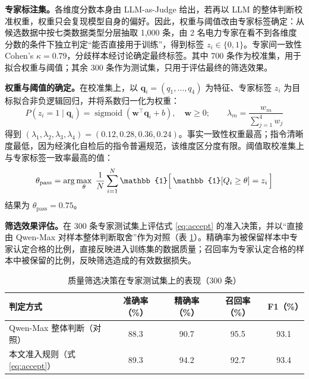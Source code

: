 \documentclass[fontset=fandol,type=master,campus=shenzhen,etitleauto=true]{hithesisbook}
\begin{document}
\textbf{专家标注集。}各维度分数本身由 LLM-as-Judge 给出，若再以 LLM 的整体判断校准权重，权重只会复现模型自身的偏好。因此，权重与阈值改由专家标签确定：从候选数据中按七类数据类型分层抽取 1,000 条，由 2 名电力专家在看不到各维度分数的条件下独立判定“能否直接用于训练”，得到标签 $z_i \in \{0, 1\}$。专家间一致性 Cohen's $\kappa = 0.79$，分歧样本经讨论确定最终标签。其中 700 条作为校准集，用于拟合权重与阈值；其余 300 条作为测试集，只用于评估最终的筛选效果。

\textbf{权重与阈值的确定。}在校准集上，以 $\mathbf{q}_i = (q_1, \ldots, q_4)$ 为特征、专家标签 $z_i$ 为目标拟合非负逻辑回归，并将系数归一化为权重：
\begin{equation}\label{eq:weight-calib}
P(z_i = 1 \mid \mathbf{q}_i) = \operatorname{sigmoid}(\mathbf{w}^\top \mathbf{q}_i + b), \quad \mathbf{w} \ge 0; \qquad
\lambda_m = \frac{w_m}{\sum_{j=1}^{4} w_j}
\end{equation}
得到 $(\lambda_1, \lambda_2, \lambda_3, \lambda_4) = (0.12, 0.28, 0.36, 0.24)$。事实一致性权重最高；指令清晰度最低，因为经演化自检后的指令普遍规范，该维度区分度有限。阈值取校准集上与专家标签一致率最高的值：
\begin{equation}\label{eq:theta-pass}
\theta_{\text{pass}} = \arg\max_{\theta} \; \frac{1}{N} \sum_{i=1}^{N} \mathbb{1}\Bigl[\, \mathbb{1}[Q_i \ge \theta] = z_i \,\Bigr]
\end{equation}
结果为 $\theta_{\text{pass}} = 0.75$。

\textbf{筛选效果评估。}在 300 条专家测试集上评估式 \eqref{eq:accept} 的准入决策，并以“直接由 Qwen-Max 对样本整体判断取舍”作为对照（表 \ref{tab:quality-gold}）。精确率为被保留样本中专家认定合格的比例，直接反映进入训练集的数据质量；召回率为专家认定合格的样本中被保留的比例，反映筛选造成的有效数据损失。

\begin{table}[htbp]
\centering
\caption{质量筛选决策在专家测试集上的表现（300 条）}
\label{tab:quality-gold}
\small
\renewcommand{\arraystretch}{1.15}
\begin{tabular}{l c c c c}
\toprule
\textbf{判定方式} & \textbf{准确率（\%）} & \textbf{精确率（\%）} & \textbf{召回率（\%）} & \textbf{F1（\%）} \\
\midrule
Qwen-Max 整体判断（对照） & 88.3 & 90.7 & 95.5 & 93.1 \\
本文准入规则（式 \eqref{eq:accept}） & 89.3 & 94.2 & 92.7 & 93.4 \\
\bottomrule
\end{tabular}
\end{table}
\end{document}
